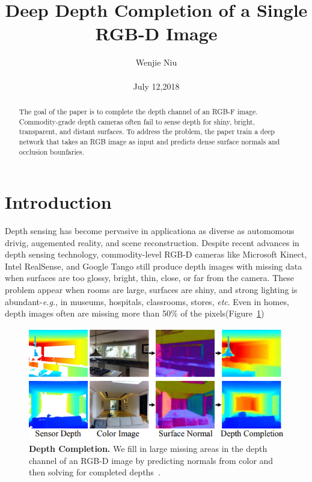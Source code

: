 \documentclass[10pt,twocolumn,letterpaper]{article}
\begin{document}
\title{Deep Depth Completion of a Single RGB-D Image}

\author{Wenjie Niu\\\\ July 12,2018}

\maketitle
\begin{abstract}
The goal of the paper is to complete the depth channel of an RGB-F image. Commodity-grade depth cameras often fail to sense depth for shiny, bright, transparent, and distant surfaces. To address the problem, the paper train a deep network that takes an RGB image as input and predicts dense surface normals and occlusion bounfaries. \par
\end{abstract}


\section{Introduction}
Depth sensing has become pervasive in applicationa as diverse as automomous drivig, augemented reality, and scene reconstruction. Despite recent advances in depth sensing technology, commodity-level RGB-D cameras like Microsoft Kinect, Intel RealSense, and Google Tango still produce depth images with missing data when surfaces are too glossy, bright, thin, close, or far from the camera. These problem appear when rooms are large, surfaces are shiny, and strong lighting is abundant-\emph{e.g.}, in museums, hospitals, classrooms, stores, \emph{etc}. Even in homes, depth images often are missing more than 50\% of the pixels(Figure~\ref{fig:Depth})

\begin{figure}[!htp]
\begin{center}
   \includegraphics[width=1\linewidth]{DepthCompletion.png}
\end{center}
   \caption{\textbf{Depth Completion.} We fill in large missing areas in the depth channel of an RGB-D image by predicting normals from color and then solving for completed depths~\cite{Zhang_2018_CVPR}.}
\label{fig:Depth}
\end{figure}
\end{document}
